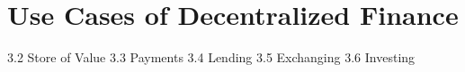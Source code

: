 \chapter{Use Cases of Decentralized Finance}
\label{cha:UseCasesDecentralizedFinance}

3.2 Store of Value
3.3 Payments
3.4 Lending
3.5 Exchanging
3.6 Investing